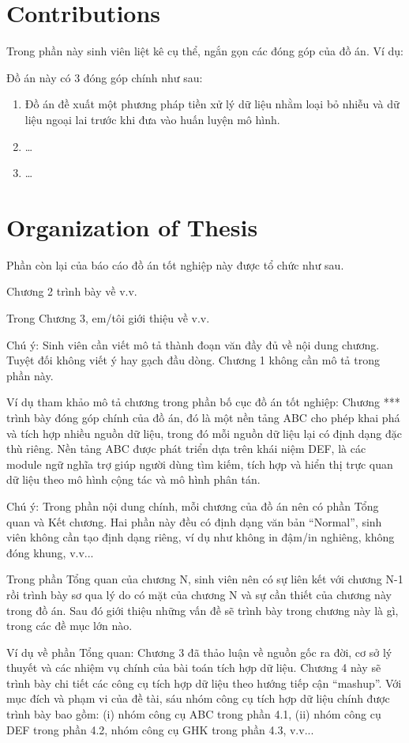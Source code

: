 \section{Contributions}
Trong phần này sinh viên liệt kê cụ thể, ngắn gọn các đóng góp của đồ án. Ví dụ: 

Đồ án này có 3 đóng góp chính như sau:

\begin{enumerate}
\item Đồ án đề xuất một phương pháp tiền xử lý dữ liệu nhằm loại bỏ nhiễu và dữ liệu ngoại lai trước khi đưa vào huấn luyện mô hình.
\item \ldots
\item \ldots 
\end{enumerate}

\section{Organization of Thesis}
Phần còn lại của báo cáo đồ án tốt nghiệp này được tổ chức như sau. 

Chương 2 trình bày về v.v. 

Trong Chương 3, em/tôi giới thiệu về v.v.

Chú ý: Sinh viên cần viết mô tả thành đoạn văn đầy đủ về nội dung chương. Tuyệt đối không viết ý hay gạch đầu dòng. Chương 1 không cần mô tả trong phần này. 

Ví dụ tham khảo mô tả chương trong phần bố cục đồ án tốt nghiệp: Chương *** trình bày đóng góp chính của đồ án, đó là một nền tảng ABC cho phép khai phá và tích hợp nhiều nguồn dữ liệu, trong đó mỗi nguồn dữ liệu lại có định dạng đặc thù riêng. Nền tảng ABC được phát triển dựa trên khái niệm DEF, là các module ngữ nghĩa trợ giúp người dùng tìm kiếm, tích hợp và hiển thị trực quan dữ liệu theo mô hình cộng tác và mô hình phân tán.  

Chú ý: Trong phần nội dung chính, mỗi chương của đồ án nên có phần Tổng quan và Kết chương. Hai phần này đều có định dạng văn bản “Normal”, sinh viên không cần tạo định dạng riêng, ví dụ như không in đậm/in nghiêng, không đóng khung, v.v... 

Trong phần Tổng quan của chương N, sinh viên nên có sự liên kết với chương N-1 rồi trình bày sơ qua lý do có mặt của chương N và sự cần thiết của chương này trong đồ án. Sau đó giới thiệu những vấn đề sẽ trình bày trong chương này là gì, trong các đề mục lớn nào.

Ví dụ về phần Tổng quan: Chương 3 đã thảo luận về nguồn gốc ra đời, cơ sở lý thuyết và các nhiệm vụ chính của bài toán tích hợp dữ liệu. Chương 4 này sẽ trình bày chi tiết các công cụ tích hợp dữ liệu theo hướng tiếp cận “mashup”. Với mục đích và phạm vi của đề tài, sáu nhóm công cụ tích hợp dữ liệu chính được trình bày bao gồm: (i) nhóm công cụ ABC trong phần 4.1, (ii) nhóm công cụ DEF trong phần 4.2, nhóm công cụ GHK trong phần 4.3, v.v...

